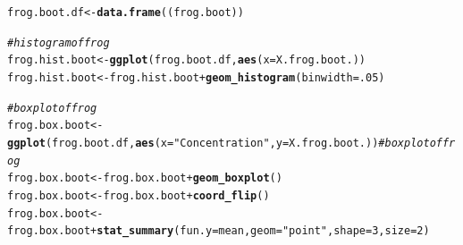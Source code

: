\documentclass{article}\usepackage[]{graphicx}\usepackage[]{color}
\makeatletter
\newcommand{\hlnum}[1]{\textcolor[rgb]{0.686,0.059,0.569}{#1}}%
\newcommand{\hlstr}[1]{\textcolor[rgb]{0.192,0.494,0.8}{#1}}%
\newcommand{\hlcom}[1]{\textcolor[rgb]{0.678,0.584,0.686}{\textit{#1}}}%
\newcommand{\hlopt}[1]{\textcolor[rgb]{0,0,0}{#1}}%
\newcommand{\hlstd}[1]{\textcolor[rgb]{0.345,0.345,0.345}{#1}}%
\newcommand{\hlkwb}[1]{\textcolor[rgb]{0.69,0.353,0.396}{#1}}%
\newcommand{\hlkwc}[1]{\textcolor[rgb]{0.333,0.667,0.333}{#1}}%
\newcommand{\hlkwd}[1]{\textcolor[rgb]{0.737,0.353,0.396}{\textbf{#1}}}%
\newenvironment{kframe}{%
 \def\at@end@of@kframe{}%
 \ifinner\ifhmode%
  \def\at@end@of@kframe{\end{minipage}}%
  \begin{minipage}{\columnwidth}%
 \fi\fi%
 \def\FrameCommand##1{\hskip\@totalleftmargin \hskip-\fboxsep
 \colorbox{shadecolor}{##1}\hskip-\fboxsep
     \hskip-\linewidth \hskip-\@totalleftmargin \hskip\columnwidth}%
 \MakeFramed {\advance\hsize-\width
   \@totalleftmargin\z@ \linewidth\hsize
   \@setminipage}}%
 {\par\unskip\endMakeFramed%
 \at@end@of@kframe}
\newenvironment{knitrout}{}{} %
\makeatother
\begin{document}
\begin{knitrout}
\color{fgcolor}\begin{kframe}
\begin{alltt}
\hlstd{frog.boot.df} \hlkwb{<-} \hlkwd{data.frame}\hlstd{((frog.boot))}

\hlcom{# histogram of frog}
\hlstd{frog.hist.boot} \hlkwb{<-} \hlkwd{ggplot}\hlstd{(frog.boot.df,} \hlkwd{aes}\hlstd{(}\hlkwc{x} \hlstd{= X.frog.boot.))}
\hlstd{frog.hist.boot} \hlkwb{<-} \hlstd{frog.hist.boot} \hlopt{+} \hlkwd{geom_histogram}\hlstd{(}\hlkwc{binwidth} \hlstd{=} \hlnum{.05}\hlstd{)}

\hlcom{# boxplot of frog}
\hlstd{frog.box.boot} \hlkwb{<-} \hlkwd{ggplot}\hlstd{(frog.boot.df,} \hlkwd{aes}\hlstd{(}\hlkwc{x} \hlstd{=} \hlstr{"Concentration"}\hlstd{,} \hlkwc{y} \hlstd{= X.frog.boot.))} \hlcom{# boxplot of frog}
\hlstd{frog.box.boot} \hlkwb{<-} \hlstd{frog.box.boot} \hlopt{+} \hlkwd{geom_boxplot}\hlstd{()}
\hlstd{frog.box.boot} \hlkwb{<-} \hlstd{frog.box.boot} \hlopt{+} \hlkwd{coord_flip}\hlstd{()}
\hlstd{frog.box.boot} \hlkwb{<-} \hlstd{frog.box.boot} \hlopt{+} \hlkwd{stat_summary}\hlstd{(}\hlkwc{fun.y} \hlstd{= mean,} \hlkwc{geom} \hlstd{=} \hlstr{"point"}\hlstd{,} \hlkwc{shape} \hlstd{=} \hlnum{3}\hlstd{,} \hlkwc{size} \hlstd{=} \hlnum{2}\hlstd{)}
\end{alltt}
\end{kframe}
\end{knitrout}
\end{document}
